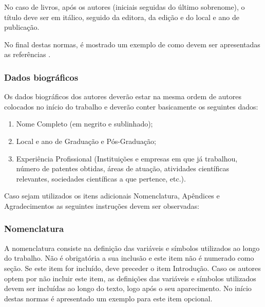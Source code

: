 No caso de livros, após os autores (iniciais seguidas do último sobrenome), o título deve ser em itálico, seguido da editora, da edição e do local e ano de publicação. 

No final destas normas, é mostrado um exemplo de como devem ser apresentadas as referências \cite{angulo_active_2013,batschauer_three-phase_2012,biela_passive_2009,de_bastiani_lange_three-level_2015,dupczak_space_2012,gong_comparative_2005,heerdt_control_2014,heldwein_novel_2009,heldwein_three-phase_2011,heldwein_implementation_2010,heldwein_impact_2009,heldwein_winding_2008,heldwein_three-phase_2010,heldwein_common_2010,lago_operation_2011,nussbaumer_modeling_2008,nussbaumer_comparison_2008,nussbaumer_differential_2006,ortmann_generalized_2012,rodrigues_three-level_2009,ruiz-caballero_symmetrical_2010,silveira_ortmann_three-phase_2015,silveira_ortmann_high_2014}.


\subsubsection{Dados biográficos} 
Os dados biográficos dos autores deverão estar na mesma ordem de autores colocados no início do trabalho e deverão conter basicamente os seguintes dados:
\begin{enumerate}
	\item Nome Completo (em negrito e sublinhado);
	\item Local e ano de Graduação e Pós-Graduação;
	\item Experiência Profissional (Instituições e empresas em que já trabalhou, número de patentes obtidas, áreas de atuação, atividades científicas relevantes, sociedades científicas a que pertence, etc.). \newline
\end{enumerate}

Caso sejam utilizados os itens adicionais Nomenclatura, Apêndices e Agradecimentos as seguintes instruções devem ser observadas:

\subsubsection{Nomenclatura} 
A nomenclatura consiste na definição das variáveis e símbolos utilizados ao longo do trabalho. Não é obrigatória a sua inclusão e este item não é numerado como seção. Se este item for incluído, deve preceder o item Introdução. Caso os autores optem por não incluir este item, as definições das variáveis e símbolos utilizados devem ser incluídas ao longo do texto, logo após o seu aparecimento. No início destas normas é apresentado um exemplo para este item opcional.

